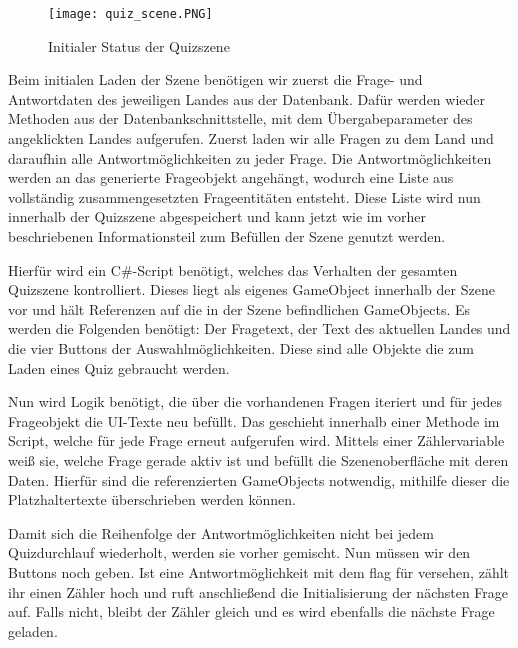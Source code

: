 \begin{figure} [h]
\centering
\texttt{[image: quiz\_scene.PNG]}
\caption{Initialer Status der Quizszene}
\label{fig:quizscene}
\end{figure}

Beim initialen Laden der Szene benötigen wir zuerst die Frage- und Antwortdaten des jeweiligen Landes aus der Datenbank.
Dafür werden wieder Methoden aus der Datenbankschnittstelle, mit dem Übergabeparameter des angeklickten Landes aufgerufen. 
Zuerst laden wir alle Fragen zu dem Land und daraufhin alle Antwortmöglichkeiten zu jeder Frage. 
Die Antwortmöglichkeiten werden an das generierte Frageobjekt angehängt, wodurch eine Liste aus vollständig zusammengesetzten Frageentitäten entsteht.
Diese Liste wird nun innerhalb der Quizszene abgespeichert und kann jetzt wie im vorher beschriebenen Informationsteil zum Befüllen der Szene genutzt werden.

Hierfür wird ein C\#-Script benötigt, welches das Verhalten der gesamten Quizszene kontrolliert.
Dieses liegt als eigenes GameObject innerhalb der Szene vor und hält Referenzen auf die in der Szene befindlichen GameObjects.
Es werden die Folgenden benötigt: Der Fragetext, der Text des aktuellen Landes und die vier Buttons der Auswahlmöglichkeiten.
Diese sind alle Objekte die zum Laden eines Quiz gebraucht werden.

Nun wird Logik benötigt, die über die vorhandenen Fragen iteriert und für jedes Frageobjekt die UI-Texte neu befüllt. Das geschieht innerhalb einer Methode im Script, welche für jede Frage erneut aufgerufen wird. 
Mittels einer Zählervariable weiß sie, welche Frage gerade aktiv ist und befüllt die Szenenoberfläche mit deren Daten.
Hierfür sind die referenzierten GameObjects notwendig, mithilfe dieser die Platzhaltertexte überschrieben werden können. 

Damit sich die Reihenfolge der Antwortmöglichkeiten nicht bei jedem Quizdurchlauf wiederholt, werden sie vorher gemischt. 
Nun müssen wir den Buttons noch  geben. 
Ist eine Antwortmöglichkeit mit dem flag für  versehen, zählt ihr  einen Zähler hoch und ruft anschließend die Initialisierung der nächsten Frage auf. 
Falls nicht, bleibt der Zähler gleich und es wird ebenfalls die nächste Frage geladen.
